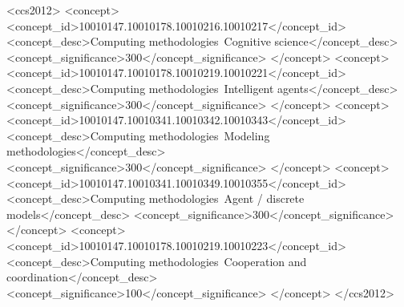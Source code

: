 %
%
\begin{CCSXML}
    <ccs2012>
    <concept>
    <concept_id>10010147.10010178.10010216.10010217</concept_id>
    <concept_desc>Computing methodologies~Cognitive science</concept_desc>
    <concept_significance>300</concept_significance>
    </concept>
    <concept>
    <concept_id>10010147.10010178.10010219.10010221</concept_id>
    <concept_desc>Computing methodologies~Intelligent agents</concept_desc>
    <concept_significance>300</concept_significance>
    </concept>
    <concept>
    <concept_id>10010147.10010341.10010342.10010343</concept_id>
    <concept_desc>Computing methodologies~Modeling methodologies</concept_desc>
    <concept_significance>300</concept_significance>
    </concept>
    <concept>
    <concept_id>10010147.10010341.10010349.10010355</concept_id>
    <concept_desc>Computing methodologies~Agent / discrete models</concept_desc>
    <concept_significance>300</concept_significance>
    </concept>
    <concept>
    <concept_id>10010147.10010178.10010219.10010223</concept_id>
    <concept_desc>Computing methodologies~Cooperation and coordination</concept_desc>
    <concept_significance>100</concept_significance>
    </concept>
    </ccs2012>
\end{CCSXML}

%
%